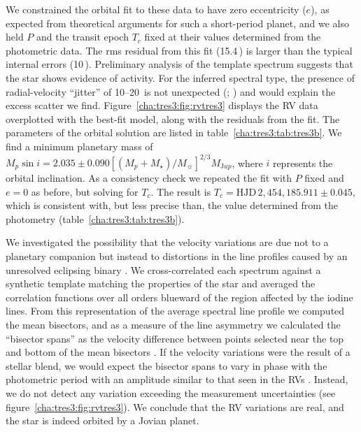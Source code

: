We constrained the orbital fit to these data to have zero eccentricity ($e$), as expected from theoretical arguments for such a short-period planet, and we also held $P$ and the transit epoch $T_c$ fixed at their values determined from the photometric data.
The rms residual from this fit (15.4\,\ms) is larger than the typical internal errors (10\,\ms).
Preliminary analysis of the template spectrum suggests that the star shows evidence of activity.
For the inferred spectral type, the presence of radial-velocity ``jitter'' of \mbox{10--20\,\ms} is not unexpected (\citealp*{Saar_Butler_Marcy:apjl:1998a}; \citealp{Santos_Mayor_Naef:aa:2000a, Wright:pasp:2005a}) and would explain the excess scatter we find.
Figure~\ref{cha:tres3:fig:rvtres3} displays the RV data overplotted with the best-fit model, along with the residuals from the fit.
The parameters of the orbital solution are listed in table~\ref{cha:tres3:tab:tres3b}.
We find a minimum planetary mass of \mbox{$M_p \sin i = 2.035 \pm 0.090 [(M_p+M_{\star})/M_{\sun}]^{2/3} M_{\mathrm Jup}$}, where $i$ represents the orbital inclination.%
As a consistency check we repeated the fit with $P$ fixed and $e = 0$ as before, but
solving for $T_c$.
The result is $T_c = \mathrm{HJD}\,2,\!454,\!185.911 \pm 0.045$, which is consistent with, but less precise than, the value determined from the photometry (table~\ref{cha:tres3:tab:tres3b}).

We investigated the possibility that the velocity variations are due not to a planetary companion but instead to distortions in the line profiles caused by an unresolved eclipsing binary \citep{Santos_Mayor_Naef:aa:2002a, Torres_Konacki_Sasselov:apj:2005a}.
We cross-correlated each spectrum against a synthetic template matching the properties of the star and averaged the correlation functions over all orders blueward of the region affected by the iodine lines.
From this representation of the average spectral line profile we computed the mean bisectors, and as a measure of the line asymmetry we calculated the ``bisector spans'' as the velocity difference between points selected near the top and bottom of the mean bisectors \citep{Torres_Konacki_Sasselov:apj:2005a}.
If the velocity variations were the result of a stellar blend, we would expect the bisector spans to vary in phase with the photometric period with an amplitude similar to that seen in the RVs \citep{Queloz_Henry_Sivan:aa:2001a, Mandushev_Torres_Latham:apj:2005a}.
Instead, we do not detect any variation exceeding the measurement uncertainties (see figure~\ref{cha:tres3:fig:rvtres3}).
We conclude that the RV variations are real, and the star is indeed orbited by a Jovian
planet.

